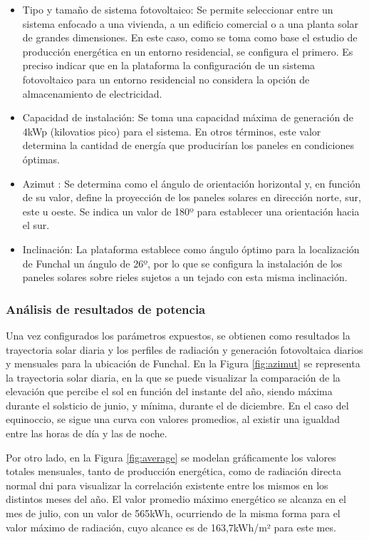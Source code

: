 \begin{itemize}
    \item Tipo y tamaño de sistema fotovoltaico: Se permite seleccionar entre un sistema enfocado a una vivienda, a un edificio comercial o a una planta solar de grandes dimensiones. En este caso, como se toma como base el estudio de producción energética en un entorno residencial, se configura el primero. Es preciso indicar que en la plataforma la configuración de un sistema fotovoltaico para un entorno residencial no considera la opción de almacenamiento de electricidad.
    \item Capacidad de instalación: Se toma una capacidad máxima de generación de 4kWp (kilovatios pico) para el sistema. En otros términos, este valor determina la cantidad de energía que producirían los paneles en condiciones óptimas.
    \item Azimut \cite{azimut}: Se determina como el ángulo de orientación horizontal y, en función de su valor, define la proyección de los paneles solares en dirección norte, sur, este u oeste. Se indica un valor de 180º para establecer una orientación hacia el sur. 
    \item Inclinación: La plataforma establece como ángulo óptimo para la localización de Funchal un ángulo de 26º, por lo que se configura la instalación de los paneles solares sobre rieles sujetos a un tejado con esta misma inclinación.
\end{itemize}

\subsubsection{Análisis de resultados de potencia}
\label{sec:analisisglobal}

Una vez configurados los parámetros expuestos, se obtienen como resultados la trayectoria solar diaria y los perfiles de radiación y generación fotovoltaica diarios y mensuales para la ubicación de Funchal. En la Figura \ref{fig:azimut} se representa la trayectoria solar diaria, en la que se puede visualizar la comparación de la elevación que percibe el sol en función del instante del año, siendo máxima durante el solsticio de junio, y mínima, durante el de diciembre. En el caso del equinoccio, se sigue una curva con valores promedios, al existir una igualdad entre las horas de día y las de noche. 

\vspace{3mm}

Por otro lado, en la Figura \ref{fig:average} se modelan gráficamente los valores totales mensuales, tanto de producción energética, como de radiación directa normal \gls{dni} para visualizar la correlación existente entre los mismos en los distintos meses del año. El valor promedio máximo energético se alcanza en el mes de julio, con un valor de 565kWh, ocurriendo de la misma forma para el valor máximo de radiación, cuyo alcance es de 163,7kWh/m² para este mes.

